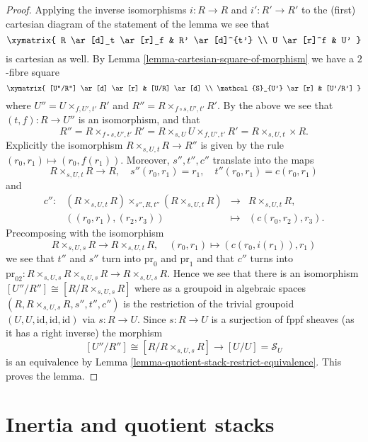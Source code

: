\begin{proof}
Applying the inverse isomorphisms $i : R \to R$ and $i' : R' \to R'$
to the (first) cartesian diagram of the statement of the lemma we see
that
$$
\xymatrix{
R \ar[d]_t \ar[r]_f & R' \ar[d]^{t'} \\
U \ar[r]^f & U'
}
$$
is cartesian as well. By
Lemma \ref{lemma-cartesian-square-of-morphism}
we have a $2$-fibre square
$$
\xymatrix{
[U''/R''] \ar[d] \ar[r] & [U/R] \ar[d] \\
\mathcal{S}_{U'} \ar[r] & [U'/R']
}
$$
where $U'' = U \times_{f, U', t'} R'$ and
$R'' = R \times_{f \circ s, U', t'} R'$. By the above
we see that $(t, f) : R \to U''$ is an isomorphism, and that
$$
R'' =
R \times_{f \circ s, U', t'} R' =
R \times_{s, U} U \times_{f, U', t'} R' =
R \times_{s, U, t} \times R.
$$
Explicitly the isomorphism $R \times_{s, U, t} R \to R''$ is given by
the rule $(r_0, r_1) \mapsto (r_0, f(r_1))$.
Moreover, $s'', t'', c''$ translate into the maps
$$
R \times_{s, U, t} R \to R,
\quad
s''(r_0, r_1) = r_1, \quad t''(r_0, r_1) = c(r_0, r_1)
$$
and
$$
\begin{matrix}
c'' : &
(R \times_{s, U, t} R) \times_{s'', R, t''} (R \times_{s, U, t} R)
&
\longrightarrow
&
R \times_{s, U, t} R, \\
&
((r_0, r_1), (r_2, r_3)) &
\longmapsto & (c(r_0, r_2), r_3).
\end{matrix}
$$
Precomposing with the isomorphism
$$
R \times_{s, U, s} R \longrightarrow R \times_{s, U, t} R,
\quad
(r_0, r_1) \longmapsto (c(r_0, i(r_1)), r_1)
$$
we see that $t''$ and $s''$ turn into
$\text{pr}_0$ and $\text{pr}_1$ and that $c''$ turns into
$\text{pr}_{02} :
R \times_{s, U, s} R \times_{s, U, s} R \to R \times_{s, U, s} R$.
Hence we see that there is an isomorphism
$[U''/R''] \cong [R/R \times_{s, U, s} R]$ where as a groupoid
in algebraic spaces $(R, R \times_{s, U, s} R, s'', t'', c'')$
is the restriction of the trivial groupoid
$(U, U, \text{id}, \text{id}, \text{id})$ via $s : R \to U$.
Since $s : R \to U$ is a surjection of fppf sheaves (as it has a
right inverse) the morphism
$$
[U''/R''] \cong [R/R \times_{s, U, s} R]
\longrightarrow
[U/U] = \mathcal{S}_U
$$
is an equivalence by
Lemma \ref{lemma-quotient-stack-restrict-equivalence}.
This proves the lemma.
\end{proof}





\section{Inertia and quotient stacks}
\label{section-inertia}

